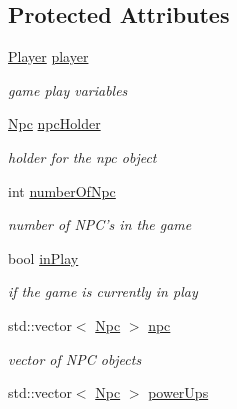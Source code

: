 \subsection*{Protected Attributes}
\begin{DoxyCompactItemize}
\item 
\hyperlink{class_player}{Player} \hyperlink{class_game_play_a08dc6e920f9c76ce54be4e5d2095851b}{player}
\begin{DoxyCompactList}\small\item\em game play variables \end{DoxyCompactList}\item 
\hypertarget{class_game_play_a69aedc07836f2a6630702874e93eec47}{\hyperlink{class_npc}{Npc} \hyperlink{class_game_play_a69aedc07836f2a6630702874e93eec47}{npc\-Holder}}\label{class_game_play_a69aedc07836f2a6630702874e93eec47}

\begin{DoxyCompactList}\small\item\em holder for the npc object \end{DoxyCompactList}\item 
\hypertarget{class_game_play_ab0d25bacfb204bb2afa6763ef9a75ff7}{int \hyperlink{class_game_play_ab0d25bacfb204bb2afa6763ef9a75ff7}{number\-Of\-Npc}}\label{class_game_play_ab0d25bacfb204bb2afa6763ef9a75ff7}

\begin{DoxyCompactList}\small\item\em number of N\-P\-C's in the game \end{DoxyCompactList}\item 
\hypertarget{class_game_play_af6a6d6655b44e08772197ff964992560}{bool \hyperlink{class_game_play_af6a6d6655b44e08772197ff964992560}{in\-Play}}\label{class_game_play_af6a6d6655b44e08772197ff964992560}

\begin{DoxyCompactList}\small\item\em if the game is currently in play \end{DoxyCompactList}\item 
\hypertarget{class_game_play_acbc454f0ef89136874c5cea74064aa6f}{std\-::vector$<$ \hyperlink{class_npc}{Npc} $>$ \hyperlink{class_game_play_acbc454f0ef89136874c5cea74064aa6f}{npc}}\label{class_game_play_acbc454f0ef89136874c5cea74064aa6f}

\begin{DoxyCompactList}\small\item\em vector of N\-P\-C objects \end{DoxyCompactList}\item 
\hypertarget{class_game_play_a8fc2705e520ebb05be8c7e69c318f232}{std\-::vector$<$ \hyperlink{class_npc}{Npc} $>$ \hyperlink{class_game_play_a8fc2705e520ebb05be8c7e69c318f232}{power\-Ups}}\label{class_game_play_a8fc2705e520ebb05be8c7e69c318f232}


\end{DoxyCompactItemize}
